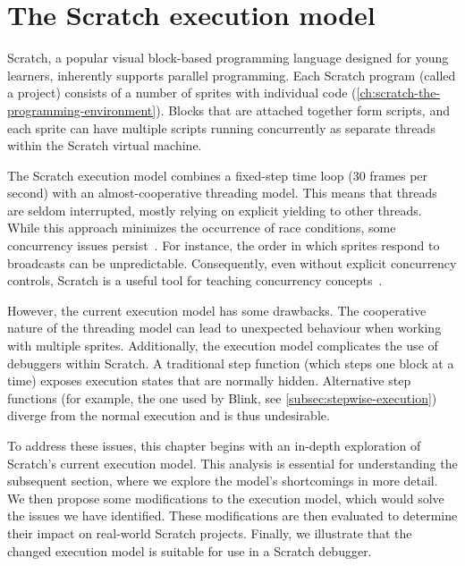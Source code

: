 \documentclass[../main]{subfiles}
\begin{document}
\chapter{The Scratch execution model}\label{ch:scratch-execution-model}


Scratch, a popular visual block-based programming language designed for young learners, inherently supports parallel programming.
Each Scratch program (called a project) consists of a number of sprites with individual code (\cref{ch:scratch-the-programming-environment}).
Blocks that are attached together form scripts, and each sprite can have multiple scripts running concurrently as separate threads within the Scratch virtual machine.

The Scratch execution model combines a fixed-step time loop (30 frames per second) with an almost-cooperative threading model.
This means that threads are seldom interrupted, mostly relying on explicit yielding to other threads.
While this approach minimizes the occurrence of race conditions, some concurrency issues persist~\autocite{maloneyScratchProgrammingLanguage2010}.
For instance, the order in which sprites respond to broadcasts can be unpredictable.
Consequently, even without explicit concurrency controls, Scratch is a useful tool for teaching concurrency concepts~\autocite{fatourouTeachingConcurrentProgramming2018}.

However, the current execution model has some drawbacks.
The cooperative nature of the threading model can lead to unexpected behaviour when working with multiple sprites.
Additionally, the execution model complicates the use of debuggers within Scratch.
A traditional step function (which steps one block at a time) exposes execution states that are normally hidden.
Alternative step functions (for example, the one used by Blink, see \cref{subsec:stepwise-execution}) diverge from the normal execution and is thus undesirable.

To address these issues, this chapter begins with an in-depth exploration of Scratch's current execution model.
This analysis is essential for understanding the subsequent section, where we explore the model's shortcomings in more detail.
We then propose some modifications to the execution model, which would solve the issues we have identified.
These modifications are then evaluated to determine their impact on real-world Scratch projects.
Finally, we illustrate that the changed execution model is suitable for use in a Scratch debugger.
\end{document}
